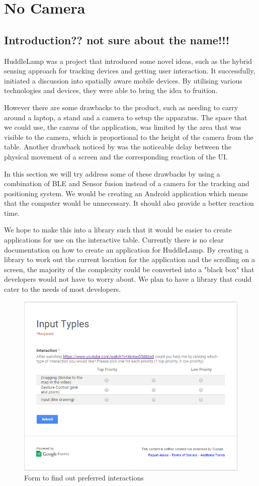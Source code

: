 \chapter{No Camera}

\label{ch:no_camera}

\section{Introduction?? not sure about the name!!!}
HuddleLamp was a project that introduced some novel ideas, such as the hybrid sensing approach for tracking devices and getting user interaction. It successfully, initiated a discussion into spatially aware mobile devices. By utilising various technologies and devices, they were able to bring the idea to fruition. 

However there are some drawbacks to the product, such as needing to carry around a laptop, a stand and a camera to setup the apparatus. The space that we could use, the canvas of the application, was limited by the area that was visible to the camera, which is proportional to the height of the camera from the table. Another drawback noticed by \citeauthor{huddlelamp-paper} was the noticeable delay between the physical movement of a screen and the corresponding reaction of the UI\cite{huddlelamp-paper}. 

In this section we will try address some of these drawbacks by using a combination of BLE and Sensor fusion instead of a camera for the tracking and positioning system. We would be creating an Android application which means that the computer would be unnecessary. It should also provide a better reaction time. 

We hope to make this into a library such that it would be easier to create applications for use on the interactive table. Currently there is no clear documentation on how to create an application for HuddleLamp. By creating a library to work out the current location for the application and the scrolling on a screen, the majority of the complexity could be converted into a "black box" that developers would not have to worry about. We plan to have a library that could cater to the needs of most developers. 

\begin{figure}[h]
  \includegraphics[scale=0.7]{images/googleform}
  \protect\caption{Form to find out preferred interactions} 
  \label{googleform}
\end{figure}